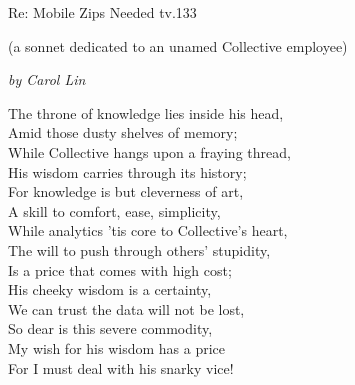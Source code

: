 \documentclass[10pt,letterpaper]{article}
\begin{document}
\begin{centering}

{\Huge Re: Mobile Zips Needed tv.133}  \vspace{.5cm} 

{\large (a sonnet dedicated to an unamed Collective employee)} \vspace{.5cm}

\emph{\large by Carol Lin} \vspace{1cm}

{
\Large
\noindent The throne of knowledge lies inside his head, \\
Amid those dusty shelves of memory; \\
While Collective hangs upon a fraying thread, \\
His wisdom carries through its history; \\
For knowledge is but cleverness of art, \\
A skill to comfort, ease, simplicity, \\
While analytics 'tis core to Collective's heart, \\
The will to push through others' stupidity, \\
Is a price that comes with high cost; \\
His cheeky wisdom is a certainty, \\ 
We can trust the data will not be lost, \\
So dear is this severe commodity, \\
My wish for his wisdom has a price \\
For I must deal with his snarky vice!
}

\end{centering}
\end{document}

